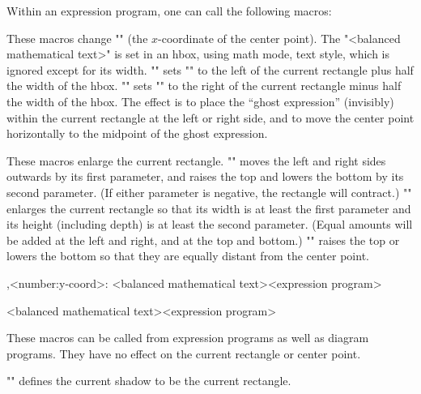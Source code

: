 \documentclass[11pt]{article}
\begin{document}
Within an expression program, one can call the following macros:
\begin{myverb}

\end{myverb}
These macros change "\xcenter" (the $x$-coordinate of the center point).
The "<balanced mathematical text>" is set in an hbox, using math mode,
text style, which is ignored except for its width.  "\leftghost" sets
"\xcenter" to the left of the current rectangle plus half the width of
the hbox. "\rightghost" sets "\xcenter" to the right of the current rectangle
minus half the width of the hbox.  The effect is to place the ``ghost
expression'' (invisibly) within the current rectangle at the left or
right side, and to move the center point horizontally to the midpoint of
the ghost expression.
\begin{myverb}


    \symmetrize
\end{myverb}
These macros enlarge the current rectangle.  "\border" moves the left and
right sides outwards by its first parameter, and  raises the top and lowers
the bottom by its second parameter.   (If either parameter is negative,
the rectangle will contract.)  "\borderto" enlarges the current rectangle
so that its width is at least the first parameter and its height (including
depth) is at least the second parameter.  (Equal amounts will be added at
the left and right, and at the top and bottom.)  "\symmetrize" raises the top
or lowers the bottom so that they are equally distant from the center point.
\begin{myverb}
    ,<number:y-coord>:
        {<balanced mathematical text>}{<expression program>}

        {<balanced mathematical text>}{<expression program>}
\end{myverb}
These macros can be called from expression programs as well as diagram
programs.  They have no effect on the current rectangle or center point.
\begin{myverb}
    \rect
\end{myverb}
"\rect" defines the current shadow to be the current rectangle.
\begin{myverb}
    \hexagon
\end{myverb}
\end{document}
